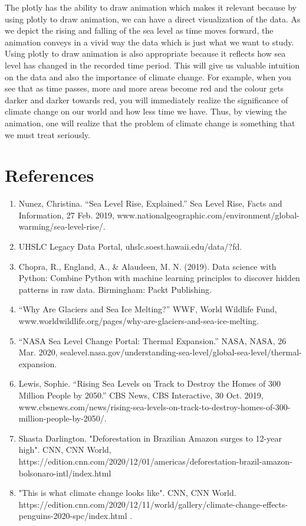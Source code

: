 \documentclass[fontsize=11pt]{article}
\begin{document}
    The plotly has the ability to draw animation which makes it relevant because by using plotly to draw animation, we can have a direct visualization of the data. As we depict the rising and falling of the sea level as time moves forward, the animation conveys in a vivid way the data which is just what we want to study. \\
    Using plotly to draw animation is also appropriate because it reflects how sea level has changed in the recorded time period. This will give us valuable intuition on the data and also the importance of climate change. For example, when you see that as time passes, more and more areas become red and the colour gets darker and darker towards red, you will immediately realize the significance of climate change on our world and how less time we have. Thus, by viewing the animation, one will realize that the problem of climate change is something that we must treat seriously.


    \section*{References}
    \begin{enumerate}
        \item
        Nunez, Christina. “Sea Level Rise, Explained.” Sea Level Rise, Facts and Information, 27 Feb. 2019, www.nationalgeographic.com/environment/global-warming/sea-level-rise/.
        \item
        UHSLC Legacy Data Portal, uhslc.soest.hawaii.edu/data/?fd.
        \item
        Chopra, R., England, A., \& Alaudeen, M. N. (2019). Data science with Python: Combine Python with machine learning principles to discover hidden patterns in raw data. Birmingham: Packt Publishing.
        \item
        “Why Are Glaciers and Sea Ice Melting?” WWF, World Wildlife Fund, www.worldwildlife.org/pages/why-are-glaciers-and-sea-ice-melting.
        \item
        “NASA Sea Level Change Portal: Thermal Expansion.” NASA, NASA, 26 Mar. 2020, sealevel.nasa.gov/understanding-sea-level/global-sea-level/thermal-expansion.
        \item
        Lewis, Sophie. “Rising Sea Levels on Track to Destroy the Homes of 300 Million People by 2050.” CBS News, CBS Interactive, 30 Oct. 2019, www.cbsnews.com/news/rising-sea-levels-on-track-to-destroy-homes-of-300-million-people-by-2050/.
        \item
        Shasta Darlington. "Deforestation in Brazilian Amazon surges to 12-year high". CNN, CNN World, https://edition.cnn.com/2020/12/01/americas/deforestation-brazil-amazon-bolsonaro-intl/index.html
        \item
        "This is what climate change looks like". CNN, CNN World. https://edition.cnn.com/2020/12/11/world/gallery/climate-change-effects-penguins-2020-spc/index.html .
    \end{enumerate}
\end{document}
